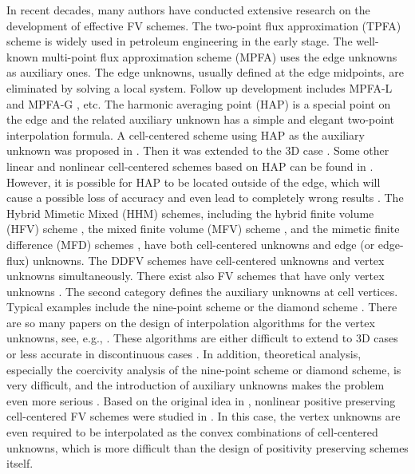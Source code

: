\documentclass[times,review,preprint,authoryear]{elsarticle}
\begin{document}
In recent decades, many authors have conducted extensive research on the development of effective FV schemes.
The two-point flux approximation (TPFA) scheme  is  widely used in petroleum engineering in the early stage. The  well-known multi-point flux approximation scheme (MPFA) \cite{Aavatsmark2002, Aavatsmark1998}  uses the edge  unknowns as  auxiliary ones. The edge unknowns, usually defined at the edge midpoints,  are  eliminated by solving a  local system. Follow up development includes MPFA-L \cite{Aavatsmark2008} and MPFA-G \cite{Agelas2010}, etc.    The harmonic averaging  point (HAP) is a special point on the edge and the related auxiliary unknown has a simple and elegant two-point interpolation formula. A cell-centered scheme using HAP as the auxiliary unknown was proposed in \cite{Agelas-Eymard2009}.
Then it was extended to the  3D case \cite{Eymard-Herbin2012}.  Some other linear and nonlinear cell-centered schemes based on HAP can be found in \cite{Lipnikov2012, wugaodai2012, sunwuzhang2013, Gao-Wu2013}.  However, it is possible for HAP to be located outside of the edge, which will cause a possible loss of accuracy and even lead to completely wrong results \cite{Terekhov2017, WZhang2020, Xie-Xu2021}. The  Hybrid Mimetic Mixed (HHM) schemes,  including the  hybrid finite volume (HFV) scheme \cite{Eymard2010}, the  mixed finite volume (MFV) scheme \cite{Droniou2006}, and the  mimetic finite difference (MFD) schemes \cite{Brezzi2005_1,Brezzi2005_2, Shashkov1995,Morel1998}, have both cell-centered unknowns and edge (or edge-flux) unknowns. The  DDFV schemes  \cite{Hermeline2000, Andreianov2007, su2018} have  cell-centered unknowns and vertex unknowns simultaneously. There exist also FV schemes that have only vertex unknowns \cite{Edwards-Zheng, Wu-Gao-Dai}. The second category  defines the auxiliary unknowns at cell vertices. Typical examples include the  nine-point scheme or the diamond scheme  \cite{li1980, Y-J-P, Wu-Dai-Gao-Yuan, gao-wu,C-C-L-C}. There are so many papers on the design of interpolation algorithms for the vertex unknowns, see, e.g., \cite{Y-J-P, gao-wu}. These algorithms are either difficult to extend to 3D cases or less accurate in discontinuous cases \cite{MiaoWu2022}.  In addition, theoretical analysis, especially the coercivity analysis of the nine-point scheme or diamond scheme, is very difficult, and the introduction of auxiliary unknowns makes the problem even more serious \cite{Y-J-P}.
Based on the original idea in \cite{Potier CL},  nonlinear positive preserving cell-centered FV schemes were studied in \cite{Lipnikov2007, yuan2008}. In this case,  the vertex unknowns are even required to be interpolated as the convex combinations of  cell-centered unknowns, which is  more difficult than the design of positivity preserving schemes itself.
\end{document}
